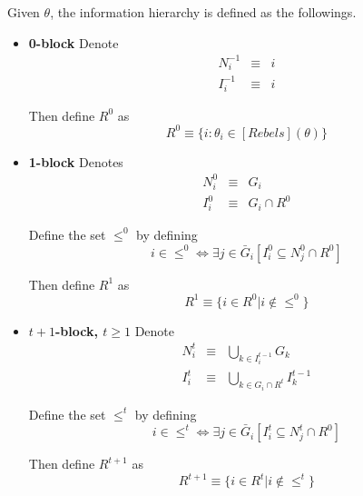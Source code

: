 \documentclass[12pt,letter]{article}
\theoremstyle{definition}
\theoremstyle{remark}
\theoremstyle{claim}
\begin{document}
 Given $\theta$, the information hierarchy is defined as the followings.
\begin{itemize}

\item \textbf{0-block}
Denote
\begin{eqnarray*}
N^{-1}_i &\equiv &  i \\
I^{-1}_i & \equiv & i
\end{eqnarray*}

Then define $R^0$ as 
\begin{equation}
R^0\equiv\{i:\theta_i\in[Rebels](\theta)\}
\end{equation}

\item \textbf{1-block}
Denotes
\begin{eqnarray*}
N^0_i &\equiv &  G_i \\
I^0_i & \equiv & G_i\cap R^0
\end{eqnarray*}

Define the set $\leq^0$ by defining
\begin{equation}i\in \leq^0 \Leftrightarrow \exists  j\in \bar{G}_i [I^0_i\subseteq N^0_j\cap R^0]\end{equation}  

Then define $R^1$ as 
\begin{equation}
R^{1} \equiv \{i\in R^0|i\notin \leq^0\}
\end{equation}

\item \textbf{$t+1$-block, $t\geq 1$}
Denote
\begin{eqnarray*}
N^t_i & \equiv & \bigcup_{k\in I^{t-1}_i}G_k \\
I^t_i & \equiv & \bigcup_{k\in G_i\cap R^t}I^{t-1}_k
\end{eqnarray*}


Define the set $\leq^t$ by defining
\begin{equation}i\in \leq^t \Leftrightarrow \exists j\in \bar{G}_i[I^t_i\subseteq N^t_j\cap R^0]\end{equation}

Then define $R^{t+1}$ as 
\begin{equation}
R^{t+1} \equiv  \{i\in R^t|i\notin \leq^t\}
\end{equation}


\end{itemize}
\end{document}
